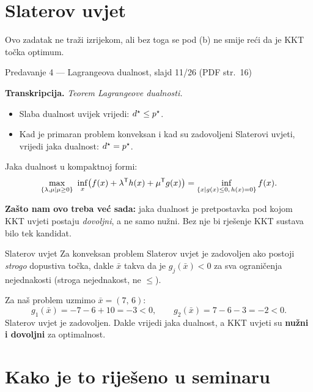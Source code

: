 \section{Slaterov uvjet}
\label{sec:z1a-slater}

Ovo zadatak ne traži izrijekom, ali bez toga se pod (b) ne smije reći da je
KKT točka optimum.

\begin{izvor}{Predavanje 4 --- Lagrangeova dualnost, slajd 11/26 (PDF str.~16)}

\textbf{Transkripcija.} \emph{Teorem Lagrangeove dualnosti.}
\begin{itemize}[nosep,leftmargin=*]
  \item Slaba dualnost uvijek vrijedi: $d^{\star} \leq p^{\star}$.
  \item Kad je primaran problem konveksan i kad su zadovoljeni Slaterovi uvjeti,
        vrijedi jaka dualnost: $d^{\star} = p^{\star}$.
\end{itemize}
Jaka dualnost u kompaktnoj formi:
\[
\max_{\{\lambda,\mu \mid \mu \geq 0\}} \ \inf_x \bigl(f(x) + \lambda^{\mathsf{T}} h(x) + \mu^{\mathsf{T}} g(x)\bigr)
= \inf_{\{x \mid g(x) \leq 0,\, h(x) = 0\}} f(x).
\]

\textbf{Zašto nam ovo treba već sada:} jaka dualnost je pretpostavka pod kojom
KKT uvjeti postaju \emph{dovoljni}, a ne samo nužni. Bez nje bi rješenje KKT
sustava bilo tek kandidat.
\end{izvor}

\begin{pojam}{Slaterov uvjet}
Za konveksan problem Slaterov uvjet je zadovoljen ako postoji \emph{strogo}
dopustiva točka, dakle $\bar{x}$ takva da je $g_j(\bar{x}) < 0$ za sva
ograničenja nejednakosti (stroga nejednakost, ne $\leq$).
\end{pojam}

Za naš problem uzmimo $\bar{x} = (7,\, 6)$:
\begin{equation}
g_1(\bar{x}) = -7 - 6 + 10 = -3 < 0, \qquad
g_2(\bar{x}) = 7 - 6 - 3 = -2 < 0 .
\end{equation}
Slaterov uvjet je zadovoljen. Dakle vrijedi jaka dualnost, a KKT uvjeti su
\textbf{nužni i dovoljni} za optimalnost.

\section{Kako je to riješeno u seminaru}
\label{sec:z1a-seminar}

